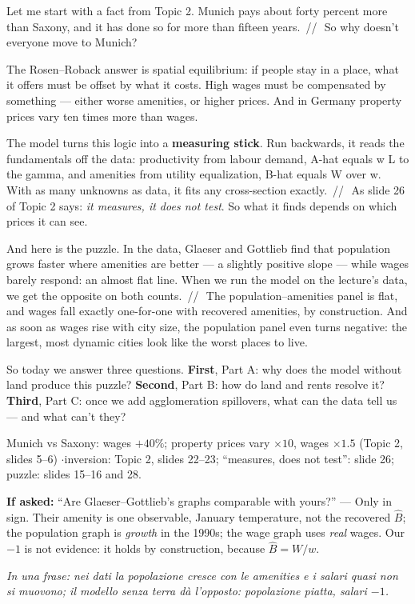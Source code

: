 \documentclass[11pt,a4paper]{article}
\newcommand{\idea}[1]{\par{\small\itshape\color{unicablue}In una frase: #1}\par}
\newcommand{\pause}{\textcolor{unicared}{\,/\!/\,}}
\begin{document}
\begin{say}
Let me start with a fact from Topic 2. Munich pays about forty percent more than Saxony, and it has done so for more than fifteen years. \pause\ So why doesn't everyone move to Munich?

The Rosen--Roback answer is spatial equilibrium: if people stay in a place, what it offers must be offset by what it costs. High wages must be compensated by something --- either worse amenities, or higher prices. And in Germany property prices vary ten times more than wages.

The model turns this logic into a \textbf{measuring stick}. Run backwards, it reads the fundamentals off the data: productivity from labour demand, A-hat equals w L to the gamma, and amenities from utility equalization, B-hat equals W over w. With as many unknowns as data, it fits any cross-section exactly. \pause\ As slide 26 of Topic 2 says: \emph{it measures, it does not test}. So what it finds depends on which prices it can see.

And here is the puzzle. In the data, Glaeser and Gottlieb find that population grows faster where amenities are better --- a slightly positive slope --- while wages barely respond: an almost flat line. When we run the model on the lecture's data, we get the opposite on both counts. \pause\ The population--amenities panel is flat, and wages fall exactly one-for-one with recovered amenities, by construction. And as soon as wages rise with city size, the population panel even turns negative: the largest, most dynamic cities look like the worst places to live.

So today we answer three questions. \textbf{First}, Part A: why does the model without land produce this puzzle? \textbf{Second}, Part B: how do land and rents resolve it? \textbf{Third}, Part C: once we add agglomeration spillovers, what can the data tell us --- and what can't they?
\end{say}

\begin{nums}
Munich vs Saxony: wages $+40\%$; property prices vary $\times 10$, wages $\times 1.5$ (Topic 2, slides 5--6) \quad$\cdot$\quad inversion: Topic 2, slides 22--23; ``measures, does not test'': slide 26; puzzle: slides 15--16 and 28.
\end{nums}
\begin{ask}
\textbf{If asked:} ``Are Glaeser--Gottlieb's graphs comparable with yours?'' --- Only in sign. Their amenity is one observable, January temperature, not the recovered $\hat B$; the population graph is \emph{growth} in the 1990s; the wage graph uses \emph{real} wages. Our $-1$ is not evidence: it holds by construction, because $\hat B = W/w$.
\end{ask}
\idea{nei dati la popolazione cresce con le amenities e i salari quasi non si muovono; il modello senza terra dà l'opposto: popolazione piatta, salari $-1$.}
\end{document}
